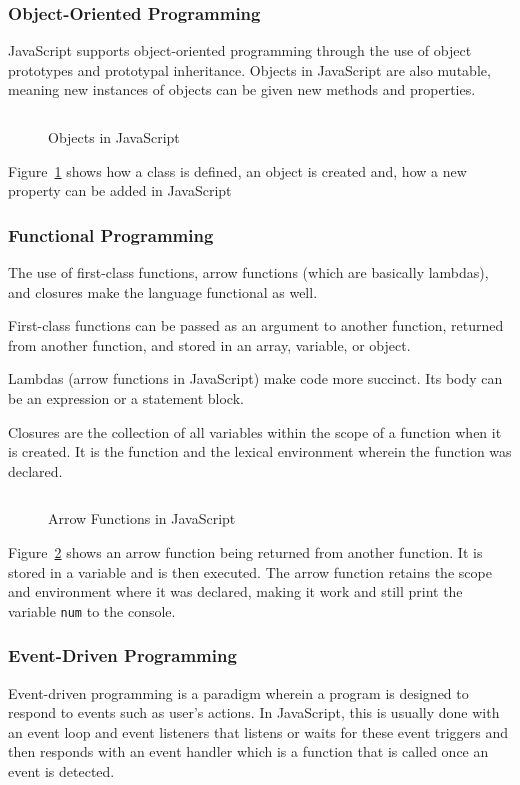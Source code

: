 \documentclass{article}
\newcommand{\js}[1]{\inputminted{javascript}{samples/js/#1.js}}
\newcommand{\jsin}[1]{\texttt{#1}}
\begin{document}
  \subsubsection{Object-Oriented Programming}
  JavaScript supports object-oriented programming through the use of object
  prototypes and prototypal inheritance. Objects in JavaScript are also mutable,
  meaning new instances of objects can be given new methods and properties.

  \begin{figure}[ht]
    \js{oop}
    \caption{Objects in JavaScript}
    \label{fig:oop}
  \end{figure}

  Figure~\ref{fig:oop} shows how a class is defined, an object is created and,
  how a new property can be added in JavaScript

  \subsubsection{Functional Programming}
  The use of first-class functions, arrow functions (which are basically
  lambdas), and closures make the language functional as well.

  First-class functions can be passed as an argument to another function,
  returned from another function, and stored in an array, variable, or object.

  Lambdas (arrow functions in JavaScript) make code more succinct. Its body can
  be an expression or a statement block.

  Closures are the collection of all variables within the scope of a function
  when it is created. It is the function and the lexical environment wherein the
  function was declared.
  
  \begin{figure}[ht]
    \js{arrow}
    \caption{Arrow Functions in JavaScript}
    \label{fig:arrow}
  \end{figure}

  Figure~\ref{fig:arrow} shows an arrow function being returned from another
  function. It is stored in a variable and is then executed. The arrow function
  retains the scope and environment where it was declared, making it work and
  still print the variable \jsin{num} to the console.

  \subsubsection{Event-Driven Programming}
  Event-driven programming is a paradigm wherein a program is designed to
  respond to events such as user’s actions. In JavaScript, this is usually done
  with an event loop and event listeners that listens or waits for these event
  triggers and then responds with an event handler which is a function that is
  called once an event is detected.
\end{document}

